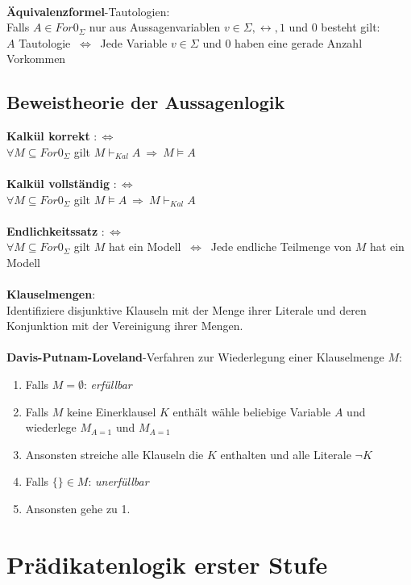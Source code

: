 \documentclass[a4paper,11pt]{scrartcl}
\newcommand{\tbf}{\textbf}
\newcommand{\Lra}{\Leftrightarrow}
\newcommand{\Forn}{For0_\Sigma}
\newcommand{\fol}{\vDash}
\newcommand{\folk}{\vdash}
\theoremstyle{default}
\begin{document}
\ \\ \tbf{Äquivalenzformel}-Tautologien: \\
Falls $A \in \Forn$ nur aus Aussagenvariablen $v \in \Sigma, \leftrightarrow, 1$ und $0$ besteht gilt:\\
$A$ Tautologie $\ \Lra \ $ Jede Variable $v \in \Sigma$ und $0$ haben eine gerade Anzahl Vorkommen\\

\subsection{Beweistheorie der Aussagenlogik}
\tbf{Kalkül korrekt} $:\Lra$ \\
$\forall M \subseteq \Forn$ gilt $M \folk_{Kal} A \ \Rightarrow \ M \fol A$ \\
\ \\ \tbf{Kalkül vollständig} $:\Lra$ \\
$\forall M \subseteq \Forn$ gilt $M \fol A \ \Rightarrow \ M \folk_{Kal} A$ \\
\ \\ \tbf{Endlichkeitssatz} $:\Lra$ \\
$\forall M \subseteq \Forn$ gilt $M$ hat ein Modell $\ \Lra \ $ Jede endliche Teilmenge von $M$ hat ein Modell \\
\ \\ \tbf{Klauselmengen}:\\
Identifiziere disjunktive Klauseln mit der Menge ihrer Literale und deren Konjunktion mit der Vereinigung ihrer Mengen. \\
\ \\ \tbf{Davis-Putnam-Loveland}-Verfahren zur Wiederlegung einer Klauselmenge $M$:
\begin{enumerate}
 \item Falls $M = \emptyset$: \textit{erfüllbar}
 \item Falls $M$ keine Einerklausel $K$ enthält wähle beliebige Variable $A$ und wiederlege $M_{A=1}$ und $M_{A=1}$
 \item Ansonsten streiche alle Klauseln die $K$ enthalten und alle Literale $\neg K$
 \item Falls $\{\} \in M$: \textit{unerfüllbar}
 \item Ansonsten gehe zu 1.
\end{enumerate}


\newpage
\section{Prädikatenlogik erster Stufe}
\end{document}
